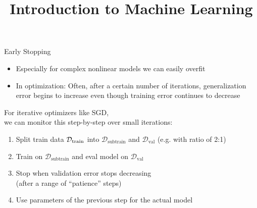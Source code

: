 \documentclass[11pt,compress,t,notes=noshow, xcolor=table]{beamer}
\title{Introduction to Machine Learning}
\begin{document}




\begin{vbframe}{Early Stopping}
  
  \begin{itemize}
    \item Especially for complex nonlinear models we can easily overfit
    \item In optimization: Often, after a certain number of iterations, generalization error begins to increase even though training error continues to decrease
  \end{itemize}

\lz
  
  \begin{figure}
    \centering
  \end{figure}

  
\framebreak

    For iterative optimizers like SGD, \\
    we can monitor this step-by-step over small iterations:

\lz
    
  \begin{enumerate}
    \item Split train data $\mathcal{D}_{\text{train}}$ into $\mathcal{D}_{\text{subtrain}}$ and $\mathcal{D}_{\text{val}}$ (e.g. with ratio of 2:1)
    \item Train on $\mathcal{D}_{\text{subtrain}}$ and eval model on $\mathcal{D}_{\text{val}}$
    \item Stop when validation error stops decreasing \\
    (after a range of \enquote{patience} steps)
    \item Use parameters of the previous step for the actual model
  \end{enumerate}


\end{vbframe}
\end{document}
